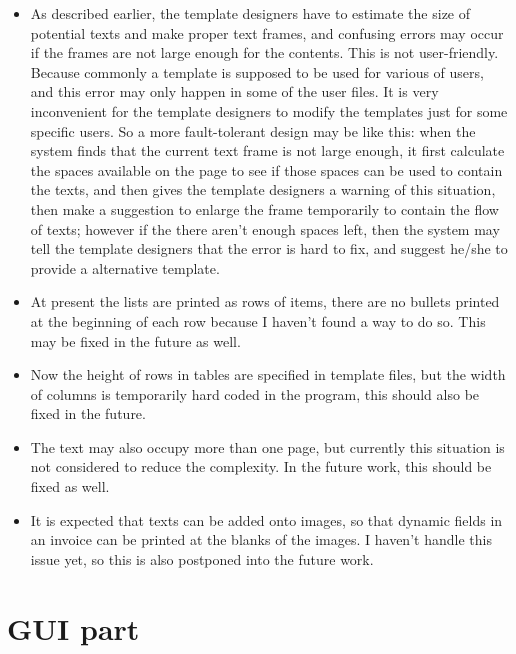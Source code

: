 \documentclass[12pt,twoside,a4paper]{report}
\begin{document}
\begin{itemize}

\item As described earlier, the template designers have to estimate the size of potential texts and make proper text frames, and confusing errors may occur if the frames are not large enough for the contents. This is not user-friendly. Because commonly a template is supposed to be used for various of users, and this error may only happen in some of the user files. It is very inconvenient for the template designers to modify the templates just for some specific users. So a more fault-tolerant design may be like this: when the system finds that the current text frame is not large enough, it first calculate the spaces available on the page to see if those spaces can be used to contain the texts, and then gives the template designers a warning of this situation, then make a suggestion to enlarge the frame temporarily to contain the flow of texts; however if the there aren't enough spaces left, then the system may tell the template designers that the error is hard to fix, and suggest he/she to provide a alternative template.

\item At present the lists are printed as rows of items, there are no bullets printed at the beginning of each row because I haven't found a way to do so. This may be fixed in the future as well.

\item Now the height of rows in tables are specified in template files, but the width of columns is temporarily hard coded in the program, this should also be fixed in the future. 

\item The text may also occupy more than one page, but currently this situation is not considered to reduce the complexity. In the future work, this should be fixed as well.

\item It is expected that texts can be added onto images, so that dynamic fields in an invoice can be printed at the blanks of the images. I haven't handle this issue yet, so this is also postponed into the future work.

\end{itemize}

\section{GUI part}
\end{document}
